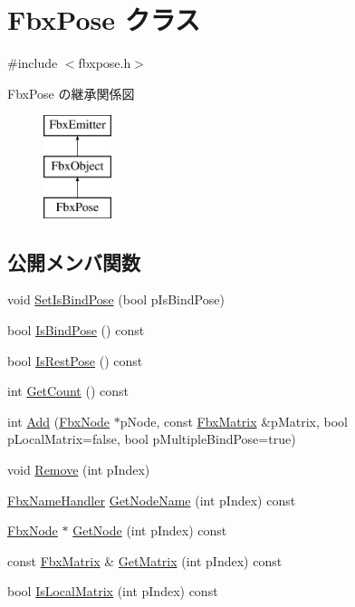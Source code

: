 \hypertarget{class_fbx_pose}{}\section{Fbx\+Pose クラス}
\label{class_fbx_pose}


{\ttfamily \#include $<$fbxpose.\+h$>$}

Fbx\+Pose の継承関係図\begin{figure}[H]
\begin{center}
\leavevmode
\includegraphics[height=3.000000cm]{class_fbx_pose}
\end{center}
\end{figure}
\subsection*{公開メンバ関数}
\begin{DoxyCompactItemize}
\item 
void \hyperlink{class_fbx_pose_ac7248f7018e656e1f95e1824d5f3b529}{Set\+Is\+Bind\+Pose} (bool p\+Is\+Bind\+Pose)
\item 
bool \hyperlink{class_fbx_pose_a6fa3e2bc1aafcdfd958923eb628d6ad5}{Is\+Bind\+Pose} () const
\item 
bool \hyperlink{class_fbx_pose_a4c5f2afbe45d2a5cf0725c3cdff90dcf}{Is\+Rest\+Pose} () const
\item 
int \hyperlink{class_fbx_pose_a748de4278ce7c09917571e00fcbef26b}{Get\+Count} () const
\item 
int \hyperlink{class_fbx_pose_a81218a5133b2490b4efdda6bf96bb2ae}{Add} (\hyperlink{class_fbx_node}{Fbx\+Node} $\ast$p\+Node, const \hyperlink{class_fbx_matrix}{Fbx\+Matrix} \&p\+Matrix, bool p\+Local\+Matrix=false, bool p\+Multiple\+Bind\+Pose=true)
\item 
void \hyperlink{class_fbx_pose_a8a2434897e944a957a699a19814d407f}{Remove} (int p\+Index)
\item 
\hyperlink{class_fbx_name_handler}{Fbx\+Name\+Handler} \hyperlink{class_fbx_pose_a9a6ce2c4c29248df156ca86bacdb905c}{Get\+Node\+Name} (int p\+Index) const
\item 
\hyperlink{class_fbx_node}{Fbx\+Node} $\ast$ \hyperlink{class_fbx_pose_a17056687b9315b92c04483ab298702bd}{Get\+Node} (int p\+Index) const
\item 
const \hyperlink{class_fbx_matrix}{Fbx\+Matrix} \& \hyperlink{class_fbx_pose_a40ef874ad005815e4def5900d438fdc4}{Get\+Matrix} (int p\+Index) const
\item 
bool \hyperlink{class_fbx_pose_a984ed3b9da9cc827ec15f910e79043c2}{Is\+Local\+Matrix} (int p\+Index) const
\end{DoxyCompactItemize}
